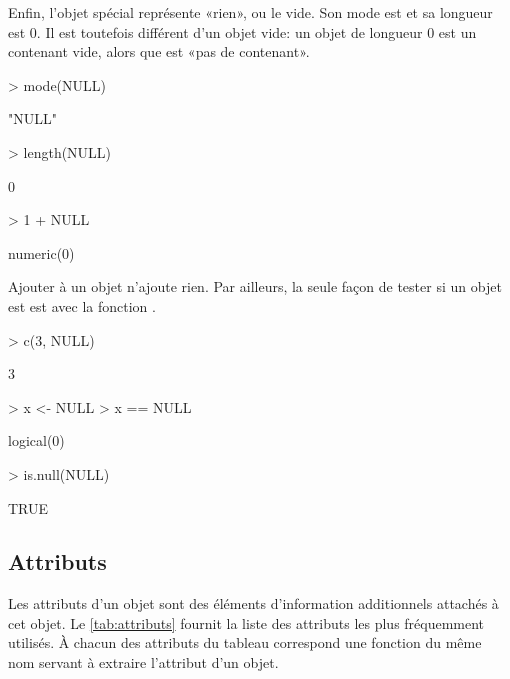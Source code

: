 Enfin, l'objet spécial  représente «rien», ou le vide. Son
mode est  et sa longueur est $0$. Il est toutefois
différent d'un objet vide: un objet de longueur $0$ est un contenant
vide, alors que  est «pas de contenant».
\begin{Schunk}
\begin{Sinput}
> mode(NULL)
\end{Sinput}
\begin{Soutput}
[1] "NULL"
\end{Soutput}
\begin{Sinput}
> length(NULL)
\end{Sinput}
\begin{Soutput}
[1] 0
\end{Soutput}
\begin{Sinput}
> 1 + NULL
\end{Sinput}
\begin{Soutput}
numeric(0)
\end{Soutput}
\end{Schunk}
Ajouter  à un objet n'ajoute rien. Par ailleurs, la seule
façon de tester si un objet est  est avec la fonction
.
\begin{Schunk}
\begin{Sinput}
> c(3, NULL)
\end{Sinput}
\begin{Soutput}
[1] 3
\end{Soutput}
\begin{Sinput}
> x <- NULL
> x == NULL
\end{Sinput}
\begin{Soutput}
logical(0)
\end{Soutput}
\begin{Sinput}
> is.null(NULL)
\end{Sinput}
\begin{Soutput}
[1] TRUE
\end{Soutput}
\end{Schunk}


\subsection{Attributs}
\label{sec:premiers:objets:attributs}

Les attributs d'un objet sont des éléments
d'information additionnels attachés à cet objet. Le
\autoref{tab:attributs} fournit la liste des attributs les plus
fréquemment utilisés. À chacun des attributs du tableau correspond une
fonction du même nom servant à extraire l'attribut d'un objet.


